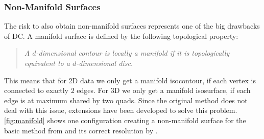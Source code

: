 \subsubsection{Non-Manifold Surfaces}
The risk to also obtain non-manifold surfaces represents one of the big drawbacks of \ac{DC}. A manifold surface is defined by the following topological property:
\begin{quote}
\emph{A $d$-dimensional contour is locally a \emph{manifold} if it is topologically equivalent to a $d$-dimensional disc.} \cite{Hermite2002}
\end{quote}
This means that for 2D data we only get a manifold isocontour, if each vertex is connected to exactly 2 edges. For 3D we only get a manifold isosurface, if each edge is at maximum shared by two \acp{quad}. Since the original method does not deal with this issue, extensions have been developed to solve this problem. \autoref{fig:manifold} shows one configuration creating a non-manifold surface for the basic method from \cite{Hermite2002} and its correct resolution by \cite{Schaefer2007}.


